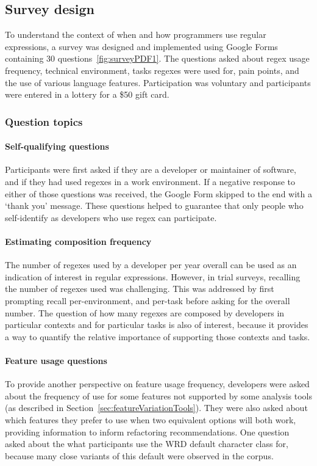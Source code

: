 \subsection{Survey design}

To understand the context of when and how programmers use regular expressions, a survey was designed and implemented using Google Forms containing 30 questions~\ref{fig:surveyPDF1}. The questions asked about regex usage frequency, technical environment, tasks regexes were used for, pain points, and the use of various language
features. Participation was voluntary and participants were entered in a lottery for a \$50 gift card.

\subsubsection{Question topics}
\paragraph{Self-qualifying questions} Participants were first asked if they are a developer or maintainer of software, and if they had used regexes in a work environment.  If a negative response to either of those questions was received, the Google Form skipped to the end with a `thank you' message.  These questions helped to guarantee that only people who self-identify as developers who use regex can participate.

\paragraph{Estimating composition frequency} The number of regexes used by a developer per year overall can be used as an indication of interest in regular expressions.  However, in trial surveys, recalling the number of regexes used was challenging.  This was addressed by first prompting recall per-environment, and per-task before asking for the overall number.  The question of how many regexes are composed by developers in particular contexts and for particular tasks is also of interest, because it provides a way to quantify the relative importance of supporting those contexts and tasks.

\paragraph{Feature usage questions} To provide another perspective on feature usage frequency, developers were asked about the frequency of use for some features not supported by some analysis tools (as described in Section~\ref{sec:featureVariationTools}).  They were also asked about which features they prefer to use when two equivalent options will both work, providing information to inform refactoring recommendations.  One question asked about the what participants use the WRD default character class for, because many close variants of this default were observed in the corpus.

